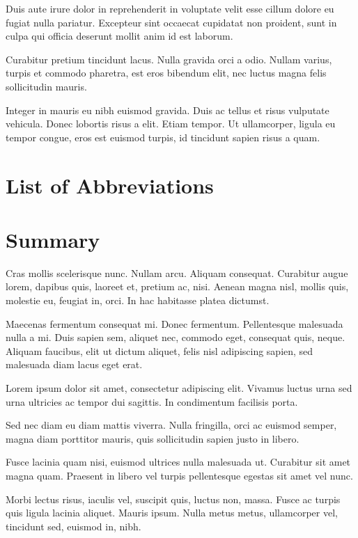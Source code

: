 \documentclass[12pt,reqno,oneside]{amsbook}
\theoremstyle{definition}
\begin{document}
Duis aute irure dolor in reprehenderit in voluptate velit esse cillum dolore eu fugiat nulla pariatur. Excepteur sint occaecat cupidatat non proident, sunt in culpa qui officia deserunt mollit anim id est laborum.

Curabitur pretium tincidunt lacus. Nulla gravida orci a odio. Nullam varius, turpis et commodo pharetra, est eros bibendum elit, nec luctus magna felis sollicitudin mauris.

Integer in mauris eu nibh euismod gravida. Duis ac tellus et risus vulputate vehicula. Donec lobortis risus a elit. Etiam tempor. Ut ullamcorper, ligula eu tempor congue, eros est euismod turpis, id tincidunt sapien risus a quam.

\tableofcontents
\listoffigures
\listoftables

\chapter*{List of Abbreviations}

\chapter*{Summary}

Cras mollis scelerisque nunc. Nullam arcu. Aliquam consequat. Curabitur augue lorem, dapibus quis, laoreet et, pretium ac, nisi. Aenean magna nisl, mollis quis, molestie eu, feugiat in, orci. In hac habitasse platea dictumst.

Maecenas fermentum consequat mi. Donec fermentum. Pellentesque malesuada nulla a mi. Duis sapien sem, aliquet nec, commodo eget, consequat quis, neque. Aliquam faucibus, elit ut dictum aliquet, felis nisl adipiscing sapien, sed malesuada diam lacus eget erat.

Lorem ipsum dolor sit amet, consectetur adipiscing elit. Vivamus luctus urna sed urna ultricies ac tempor dui sagittis. In condimentum facilisis porta.

Sed nec diam eu diam mattis viverra. Nulla fringilla, orci ac euismod semper, magna diam porttitor mauris, quis sollicitudin sapien justo in libero.

Fusce lacinia quam nisi, euismod ultrices nulla malesuada ut. Curabitur sit amet magna quam. Praesent in libero vel turpis pellentesque egestas sit amet vel nunc.

Morbi lectus risus, iaculis vel, suscipit quis, luctus non, massa. Fusce ac turpis quis ligula lacinia aliquet. Mauris ipsum. Nulla metus metus, ullamcorper vel, tincidunt sed, euismod in, nibh.
\end{document}
